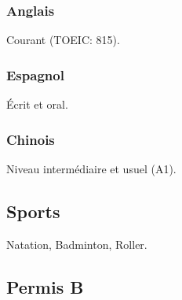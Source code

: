 \documentclass{article}
\begin{document}
\begin{multicols}{2}
                \subsubsection{Anglais}
                    Courant (TOEIC: 815).
                \subsubsection{Espagnol}
                    \'Ecrit et oral.
                \subsubsection{Chinois}
                    Niveau interm\'ediaire et usuel (A1).
                \subsection{Sports}
                    Natation, Badminton, Roller.
                \subsection{Permis B}
    \end{multicols}
\end{document}
